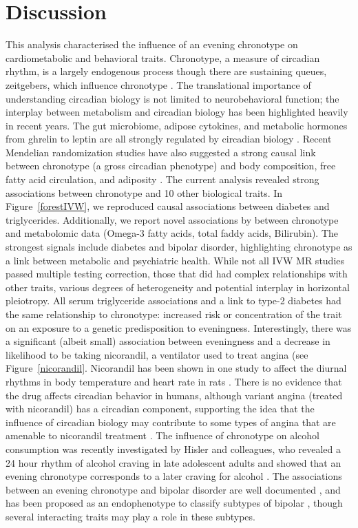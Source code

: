 \documentclass[journal,article,submit,moreauthors,pdftex]{Definitions/mdpi}
\begin{document}
\section{Discussion}

This analysis characterised the influence of an evening chronotype on cardiometabolic and behavioral traits. Chronotype, a measure of circadian rhythm, is a largely endogenous process though there are sustaining queues, zeitgebers, which influence chronotype \cite{albrecht_timing_2012}. The translational importance of understanding circadian biology is not limited to neurobehavioral function; the interplay between metabolism and circadian biology has been highlighted heavily in recent years. The gut microbiome, adipose cytokines, and metabolic hormones from ghrelin to leptin are all strongly regulated by circadian biology \cite{li_circadian_2020,socaciu_melatonin_2020,pan_circadian_2020}. Recent Mendelian randomization studies have also suggested a strong causal link between chronotype (a gross circadian phenotype) and body composition, free fatty acid circulation, and adiposity \cite{adams_evaluating_2019,jones_genome-wide_2019}. The current analysis revealed strong associations between chronotype and 10 other biological traits. In Figure~\ref{forestIVW}, we reproduced causal associations between diabetes and triglycerides. Additionally, we report novel associations by between chronotype and metabolomic data (Omega-3 fatty acids, total faddy acids, Bilirubin). The strongest signals include diabetes and bipolar disorder, highlighting chronotype as a link between metabolic and psychiatric health. While not all IVW MR studies passed multiple testing correction, those that did had complex relationships with other traits, various degrees of heterogeneity and potential interplay in horizontal pleiotropy.
All serum triglyceride associations and a link to type-2 diabetes had the same relationship to chronotype: increased risk or concentration of the trait on an exposure to a genetic predisposition to eveningness. Interestingly, there was a significant (albeit small) association between eveningness and a decrease in likelihood to be taking nicorandil, a ventilator used to treat angina (see Figure~\ref{nicorandil}. Nicorandil has been shown in one study to affect the diurnal rhythms in body temperature and heart rate in rats \cite{Gantenbein}. There is no evidence that the drug affects circadian behavior in humans, although variant angina (treated with nicorandil) has a circadian component, supporting the idea that the influence of circadian biology may contribute to some types of angina that are amenable to nicorandil treatment \cite{Kusama}. The influence of chronotype on alcohol consumption was recently investigated by Hisler and colleagues, who revealed a 24 hour rhythm of alcohol craving in late adolescent adults and showed that an evening chronotype corresponds to a later craving for alcohol \cite{Hisler}. The associations between an evening chronotype and bipolar disorder are well documented \cite{Ferrer}, and has been proposed as an endophenotype to classify subtypes of bipolar \cite{romo-nava}, though several interacting traits may play a role in these subtypes.
\end{document}
